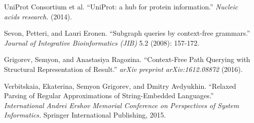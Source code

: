 \documentclass[12pt]{article}  %
\theoremstyle{definition}
\theoremstyle{remark}
\begin{document}
\begin{thebibliography}{9}

  UniProt Consortium et al.
  ``UniProt: a hub for protein information.''
  \emph{Nucleic acids research.}
  (2014).

  Sevon, Petteri, and Lauri Eronen.
  ``Subgraph queries by context-free grammars.''
  \emph{Journal of Integrative Bioinformatics (JIB)}
  5.2 (2008): 157-172.

  Grigorev, Semyon, and Anastasiya Ragozina. 
  ``Context-Free Path Querying with Structural Representation of Result.''
   \emph{arXiv preprint arXiv:1612.08872}
    (2016).


  Verbitskaia, Ekaterina, Semyon Grigorev, and Dmitry Avdyukhin.
  ``Relaxed Parsing of Regular Approximations of String-Embedded Languages.''
  \emph{International Andrei Ershov Memorial Conference on Perspectives of System Informatics.}
  Springer International Publishing, 2015.


\end{thebibliography}
\end{document}
